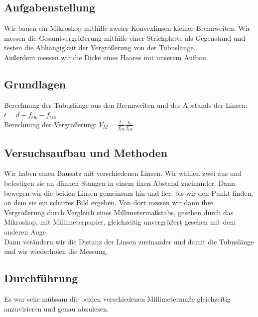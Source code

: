 \documentclass{article}
\begin{document}
\subsection{Aufgabenstellung}
Wir bauen ein Mikroskop mithilfe zweier Konvexlinsen kleiner Brennweiten. Wir messen die Gesamtvergrößerung mithilfe einer Strichplatte als Gegenstand und testen die Abhängigkeit der Vergrößerung von der Tubuslänge. \\
Außerdem messen wir die Dicke eines Haares mit unserem Aufbau.
\subsection{Grundlagen}
Berechnung der Tubuslänge aus den Brennweiten und des Abstands der Linsen: $t=d-f_{Ob}-f_{Ok}$\\
Berechnung der Vergrößerung: $V_M=\frac{t_1}{f_{Ob}}\frac{s_0}{f_{Ok}}$
\subsection{Versuchsaufbau und Methoden}
Wir haben einen Bausatz mit verschiedenen Linsen. Wir wählen zwei aus und befestigen sie an dünnen Stangen in einem fixen Abstand zueinander. Dann bewegen wir die beiden Linsen gemeinsam hin und her, bis wir den Punkt finden, an dem sie ein scharfes Bild ergeben. Von dort messen wir dann ihre Vergrößerung durch Vergleich eines Millimetermaßstabs, gesehen durch das Mikroskop, mit Millimeterpapier, gleichzeitig unvergrößert gesehen mit dem anderen Auge. \\
Dann verändern wir die Distanz der Linsen zueinander und damit die Tubuslänge und wir wiederholen die Messung.
\subsection{Durchführung}
Es war sehr mühsam die beiden verschiedenen Millimetermaße gleichzeitig anzuvisieren und genau abzulesen. 
\end{document}

